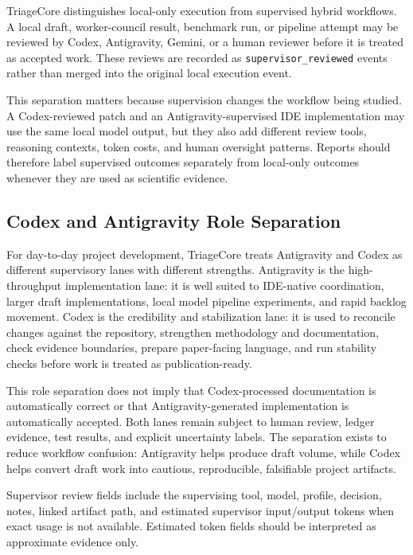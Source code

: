\documentclass[12pt]{article}
\begin{document}
TriageCore distinguishes local-only execution from supervised hybrid workflows.
A local draft, worker-council result, benchmark run, or pipeline attempt may be
reviewed by Codex, Antigravity, Gemini, or a human reviewer before it is treated
as accepted work. These reviews are recorded as
\texttt{supervisor\_reviewed} events rather than merged into the original local
execution event.

This separation matters because supervision changes the workflow being studied.
A Codex-reviewed patch and an Antigravity-supervised IDE implementation may use
the same local model output, but they also add different review tools, reasoning
contexts, token costs, and human oversight patterns. Reports should therefore
label supervised outcomes separately from local-only outcomes whenever they are
used as scientific evidence.

\subsection{Codex and Antigravity Role Separation}

For day-to-day project development, TriageCore treats Antigravity and Codex as
different supervisory lanes with different strengths. Antigravity is the
high-throughput implementation lane: it is well suited to IDE-native
coordination, larger draft implementations, local model pipeline experiments,
and rapid backlog movement. Codex is the credibility and stabilization lane: it
is used to reconcile changes against the repository, strengthen methodology and
documentation, check evidence boundaries, prepare paper-facing language, and
run stability checks before work is treated as publication-ready.

This role separation does not imply that Codex-processed documentation is
automatically correct or that Antigravity-generated implementation is
automatically accepted. Both lanes remain subject to human review, ledger
evidence, test results, and explicit uncertainty labels. The separation exists
to reduce workflow confusion: Antigravity helps produce draft volume, while
Codex helps convert draft work into cautious, reproducible, falsifiable project
artifacts.

Supervisor review fields include the supervising tool, model, profile,
decision, notes, linked artifact path, and estimated supervisor input/output
tokens when exact usage is not available. Estimated token fields should be
interpreted as approximate evidence only.
\end{document}
